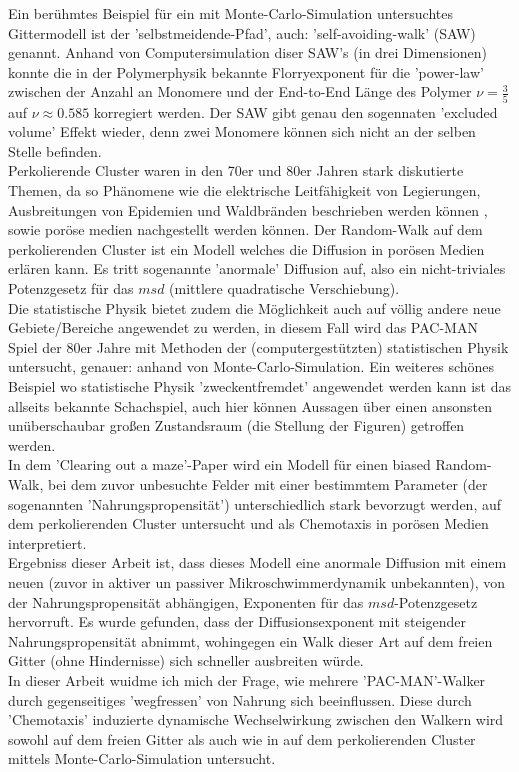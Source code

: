 \documentclass[a4paper, 12pt]{report}
\begin{document}
Ein berühmtes Beispiel für ein mit Monte-Carlo-Simulation untersuchtes Gittermodell ist der 'selbstmeidende-Pfad', auch: 'self-avoiding-walk' (SAW) genannt. Anhand von Computersimulation diser SAW's (in drei Dimensionen) konnte die in der Polymerphysik bekannte Florryexponent für die 'power-law' zwischen der Anzahl an Monomere und der End-to-End Länge des Polymer $\nu = \frac{3}{5}$ auf $\nu \approx 0.585$ korregiert werden\cite{Grassberger_1993}. Der SAW gibt genau den sogennaten 'excluded volume' Effekt wieder, denn zwei Monomere können sich nicht an der selben Stelle befinden.
\\
\noindent Perkolierende Cluster waren in den 70er und 80er Jahren stark diskutierte Themen, da so Phänomene wie die elektrische Leitfähigkeit von Legierungen, Ausbreitungen von Epidemien und Waldbränden beschrieben werden können \cite{Wiki_Perkolationstheorie}, sowie poröse medien nachgestellt werden können\cite{doi:10.1063/1.4999485}. Der Random-Walk auf dem perkolierenden Cluster ist ein Modell welches die Diffusion in porösen Medien erlären kann. Es tritt sogenannte 'anormale' Diffusion\cite{PhysRevLett.50.77} auf, also ein nicht-triviales Potenzgesetz für das $msd$ (mittlere quadratische Verschiebung).
\\
\noindent Die statistische Physik bietet zudem die Möglichkeit auch auf völlig andere neue Gebiete/Bereiche angewendet zu werden, in diesem Fall wird das PAC-MAN Spiel der 80er Jahre mit Methoden der (computergestützten) statistischen Physik untersucht\cite{doi:10.1063/1.4999485}, genauer: anhand von Monte-Carlo-Simulation. Ein weiteres schönes Beispiel wo statistische Physik 'zweckentfremdet' angewendet werden kann ist das allseits bekannte Schachspiel, auch hier können Aussagen über einen ansonsten unüberschaubar großen Zustandsraum (die Stellung der Figuren) getroffen werden\cite{Atashpendar_2016}.
\\
\noindent In dem 'Clearing out a maze'-Paper\cite{doi:10.1063/1.4999485} wird ein Modell für einen biased Random-Walk, bei dem zuvor unbesuchte Felder mit einer bestimmtem Parameter (der sogenannten 'Nahrungspropensität') unterschiedlich stark bevorzugt werden, auf dem perkolierenden Cluster untersucht und als Chemotaxis in porösen Medien interpretiert.
\\
\noindent Ergebniss dieser Arbeit ist, dass dieses Modell eine anormale Diffusion mit einem neuen (zuvor in aktiver un passiver Mikroschwimmerdynamik unbekannten), von der Nahrungspropensität abhängigen, Exponenten für das $msd$-Potenzgesetz hervorruft. Es wurde gefunden, dass der Diffusionsexponent mit steigender Nahrungspropensität abnimmt, wohingegen ein Walk dieser Art auf dem freien Gitter (ohne Hindernisse) sich schneller ausbreiten würde.
\\
\noindent In dieser Arbeit wuidme ich mich der Frage, wie mehrere 'PAC-MAN'-Walker durch gegenseitiges 'wegfressen' von Nahrung sich beeinflussen. Diese durch 'Chemotaxis' induzierte dynamische Wechselwirkung zwischen den Walkern wird sowohl auf dem freien Gitter als auch wie in \cite{doi:10.1063/1.4999485} auf dem perkolierenden Cluster mittels Monte-Carlo-Simulation untersucht.
\end{document}
